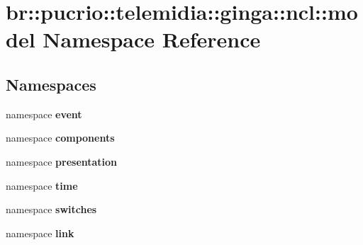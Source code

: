 \section{br::pucrio::telemidia::ginga::ncl::model Namespace Reference}
\label{namespacebr_1_1pucrio_1_1telemidia_1_1ginga_1_1ncl_1_1model}


\subsection*{Namespaces}
\begin{CompactItemize}
\item 
namespace {\bf event}
\item 
namespace {\bf components}
\item 
namespace {\bf presentation}
\item 
namespace {\bf time}
\item 
namespace {\bf switches}
\item 
namespace {\bf link}
\end{CompactItemize}
